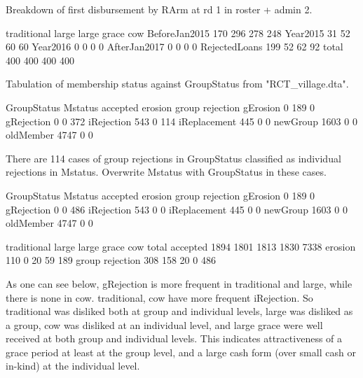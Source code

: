 Breakdown of first disbursement by \textsf{RArm} at rd 1 in \textsf{roster + admin} 2.
\begin{Schunk}
\begin{Soutput}
              traditional large large grace cow
BeforeJan2015         170   296         278 248
Year2015               31    52          60  60
Year2016                0     0           0   0
AfterJan2017            0     0           0   0
RejectedLoans         199    52          62  92
total                 400   400         400 400
\end{Soutput}
\end{Schunk}

Tabulation of membership status against \textsf{GroupStatus} from \textsf{"RCT\_village.dta"}.
\begin{Schunk}
\begin{Soutput}
              GroupStatus
Mstatus        accepted erosion group rejection
  gErosion            0     189               0
  gRejection          0       0             372
  iRejection        543       0             114
  iReplacement      445       0               0
  newGroup         1603       0               0
  oldMember        4747       0               0
\end{Soutput}
\end{Schunk}
There are 114 cases of group rejections in \textsf{GroupStatus} classified as individual rejections in \textsf{Mstatus}. Overwrite \textsf{Mstatus} with \textsf{GroupStatus} in these cases.
\begin{Schunk}
\begin{Soutput}
              GroupStatus
Mstatus        accepted erosion group rejection
  gErosion            0     189               0
  gRejection          0       0             486
  iRejection        543       0               0
  iReplacement      445       0               0
  newGroup         1603       0               0
  oldMember        4747       0               0
\end{Soutput}
\begin{Soutput}
                traditional large large grace  cow total
accepted               1894  1801        1813 1830  7338
erosion                 110     0          20   59   189
group rejection         308   158          20    0   486
\end{Soutput}
\end{Schunk}
As one can see below, \textsf{gRejection} is more frequent in \textsf{traditional} and \textsf{large}, while there is none in \textsf{cow}. \textsf{traditional, cow} have more frequent \textsf{iRejection}. So \textsf{traditional} was disliked both at group and individual levels, \textsf{large} was disliked as a group, \textsf{cow} was disliked at an individual level, and \textsf{large grace} were well received at both group and individual levels. This indicates attractiveness of a grace period at least at the group level, and a large cash form (over small cash or in-kind) at the individual level.
